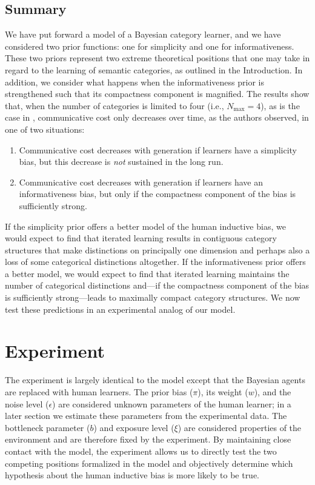 \documentclass[doc,biblatex]{apa7}
\begin{document}
\subsection{Summary}

We have put forward a model of a Bayesian category learner, and we have considered two prior functions: one for simplicity and one for informativeness. These two priors represent two extreme theoretical positions that one may take in regard to the learning of semantic categories, as outlined in the Introduction. In addition, we consider what happens when the informativeness prior is strengthened such that its compactness component is magnified. The results show that, when the number of categories is limited to four (i.e., $N_\mathrm{max} = 4$), as is the case in \textcite[][Study~2]{Carstensen:2015}, communicative cost only decreases over time, as the authors observed, in one of two situations:

	\begin{enumerate}
		\item Communicative cost decreases with generation if learners have a simplicity bias, but this decrease is \textit{not} sustained in the long run.
		\item Communicative cost decreases with generation if learners have an informativeness bias, but only if the compactness component of the bias is sufficiently strong.
	\end{enumerate}

\noindent If the simplicity prior offers a better model of the human inductive bias, we would expect to find that iterated learning results in contiguous category structures that make distinctions on principally one dimension and perhaps also a loss of some categorical distinctions altogether. If the informativeness prior offers a better model, we would expect to find that iterated learning maintains the number of categorical distinctions and---if the compactness component of the bias is sufficiently strong---leads to maximally compact category structures. We now test these predictions in an experimental analog of our model.

\section{Experiment}

The experiment is largely identical to the model except that the Bayesian agents are replaced with human learners. The prior bias ($\pi$), its weight ($w$), and the noise level ($\epsilon$) are considered unknown parameters of the human learner; in a later section we estimate these parameters from the experimental data. The bottleneck parameter ($b$) and exposure level ($\xi$) are considered properties of the environment and are therefore fixed by the experiment. By maintaining close contact with the model, the experiment allows us to directly test the two competing positions formalized in the model and objectively determine which hypothesis about the human inductive bias is more likely to be true.
\end{document}
